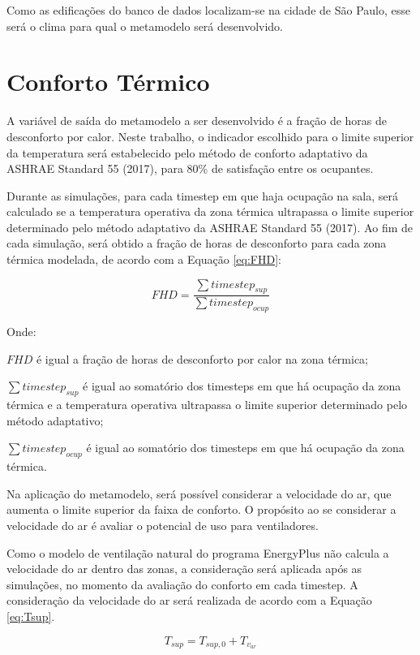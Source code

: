 \documentclass[brazil,hardcopy,openany,a5paper]{ufscthesis}
\begin{document}
	Como as edificações do banco de dados localizam-se na cidade de São Paulo, esse será o clima para qual o metamodelo será desenvolvido.
	
	\section{Conforto Térmico}
	
	A variável de saída do metamodelo a ser desenvolvido é a fração de horas de desconforto por calor. Neste trabalho, o indicador escolhido para o limite superior da temperatura será estabelecido pelo método de conforto adaptativo da ASHRAE Standard 55 (2017), para 80\% de satisfação entre os ocupantes.
	
	Durante as simulações, para cada timestep em que haja ocupação na sala, será calculado se a temperatura operativa da zona térmica ultrapassa o limite superior determinado pelo método adaptativo da ASHRAE Standard 55 (2017). Ao fim de cada simulação, será obtido a fração de horas de desconforto para cada zona térmica modelada, de acordo com a Equação \ref{eq:FHD}:
	
	\begin{equation}
	\label{eq:FHD}
	FHD = \frac{\sum{timestep_{sup}}}{\sum{timestep_{ocup}}}
	\end{equation}
	
	Onde:
	
	$FHD$ é igual a fração de horas de desconforto por calor na zona térmica;
	
	$\sum{timestep_{sup}}$ é igual ao somatório dos timesteps em que há ocupação da zona térmica e a temperatura operativa ultrapassa o limite superior determinado pelo método adaptativo;
	
	$\sum{timestep_{ocup}}$ é igual ao somatório dos timesteps em que há ocupação da zona térmica.
	
	Na aplicação do metamodelo, será possível considerar a velocidade do ar, que aumenta o limite superior da faixa de conforto. O propósito ao se considerar a velocidade do ar é avaliar o potencial de uso para ventiladores.		
	
	Como o modelo de ventilação natural do programa EnergyPlus não calcula a velocidade do ar dentro das zonas, a consideração será aplicada após as simulações, no momento da avaliação do conforto em cada timestep. A consideração da velocidade do ar será realizada de acordo com a Equação \ref{eq:Tsup}.
	
	\begin{equation}
	\label{eq:Tsup}
	T_{sup} = T_{sup,0} + T_{v_{ar}}
	\end{equation}
	
\end{document}
